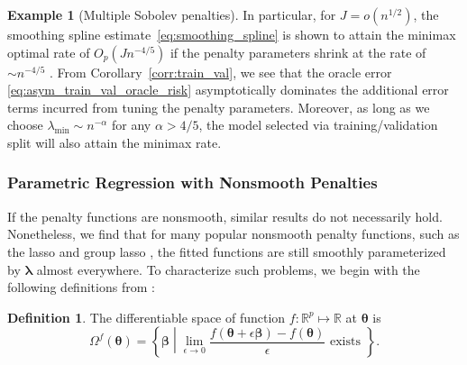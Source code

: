 \documentclass[12pt]{article} %
\theoremstyle{definition}
\newtheorem{definition}{Definition}
\newtheorem{example}{Example}
\begin{document}
\begin{example}[Multiple Sobolev penalties]
	In particular, for $J = o(n^{1/2})$, the smoothing spline estimate~\eqref{eq:smoothing_spline} is shown to attain the minimax optimal rate of $O_p(Jn^{-4/5})$ if the penalty parameters shrink at the rate of $\sim n^{-4/5}$ \citep*{sadhanala2017additive, horowitz2006optimal}.
	From Corollary~\ref{corr:train_val}, we see that the oracle error \eqref{eq:asym_train_val_oracle_risk} asymptotically dominates the additional error terms incurred from tuning the penalty parameters.
	Moreover, as long as we choose $\lambda_{\min} \sim n^{-\alpha}$ for any $\alpha > 4/5$, the model selected via training/validation split will also attain the minimax rate.
\end{example}

\subsubsection{Parametric Regression with Nonsmooth Penalties}
\label{sec:param_nonsmooth}

If the penalty functions are nonsmooth, similar results do not necessarily hold.
Nonetheless, we find that for many popular nonsmooth penalty functions, such as the lasso \citep{tibshirani1996regression} and group lasso \citep{yuan2006model}, the fitted functions are still smoothly parameterized by $\boldsymbol \lambda$ almost everywhere.
To characterize such problems, we begin with the following definitions from \citet{feng2017gradient}:

\begin{definition}
	The differentiable space of function $f:\mathbb{R}^p \mapsto \mathbb{R}$ at $\boldsymbol{\theta}$ is
	\begin{equation}
	\Omega^{f}(\boldsymbol{\theta}) = \left \{ \boldsymbol{\beta} \middle | \lim_{\epsilon \rightarrow 0} \frac{f(\boldsymbol{\theta} + \epsilon \boldsymbol{\beta}) - f(\boldsymbol{\theta})}{\epsilon} \text{ exists } \right \}.
	\end{equation}
\end{definition}
\end{document}
